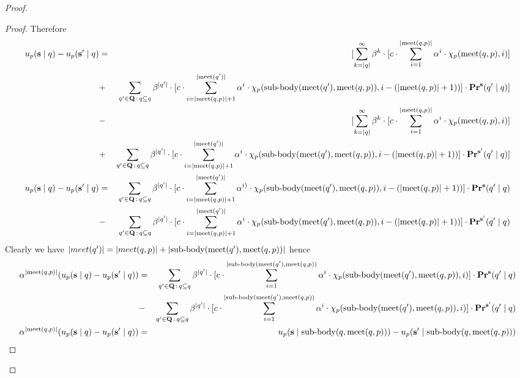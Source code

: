 \begin{proof}
\begin{proof}
Therefore
\begin{eqnarray*}
	u_p(\mathbf{s} \mid q) - u_p(\mathbf{s}' \mid q) & = & [\sum_{k = |q|}^{\infty} \beta^{k} \cdot  [{\displaystyle c \cdot \sum_{i=1}^{|\text{\rm meet}(q,p)|} \alpha^i \cdot \chi_p(\text{\rm meet}(q,p),i) }] \\
	&+ & \sum_{q' \in \mathbf{Q} \,:\, q \subseteq q} \beta^{|q'|} \cdot  [{\displaystyle c \cdot \sum_{i=|\text{\rm meet}(q,p)|+1}^{|\text{\rm meet}(q')|} \alpha^{i} \cdot \chi_p({\text{\rm sub-body}}(\text{\rm meet}(q'),\text{\rm meet}(q,p)),i-(|\text{\rm meet}(q,p)|+1))  }] \cdot \mathbf{Pr}^{\mathbf{s}}(q' \mid q) ]\\ 
	&- &[\sum_{k = |q|}^{\infty} \beta^{k} \cdot  [{\displaystyle c \cdot \sum_{i=1}^{|\text{\rm meet}(q,p)|} \alpha^i \cdot \chi_p(\text{\rm meet}(q,p),i) }] \\
	&+ & \sum_{q' \in \mathbf{Q} \,:\, q \subseteq q} \beta^{|q'|} \cdot  [{\displaystyle c \cdot \sum_{i=|\text{\rm meet}(q,p)|+1}^{|\text{\rm meet}(q')|} \alpha^{i} \cdot \chi_p({\text{\rm sub-body}}(\text{\rm meet}(q'),\text{\rm meet}(q,p)),i-(|\text{\rm meet}(q,p)|+1))  }] \cdot \mathbf{Pr}^{\mathbf{s}'}(q' \mid q) ]\\ 
	u_p(\mathbf{s} \mid q) - u_p(\mathbf{s}' \mid q) & = & \sum_{q' \in \mathbf{Q} \,:\, q \subseteq q} \beta^{|q'|} \cdot  [{\displaystyle c \cdot \sum_{i=|\text{\rm meet}(q,p)|+1}^{|\text{\rm meet}(q')|} \alpha^{i)} \cdot \chi_p({\text{\rm sub-body}}(\text{\rm meet}(q'),\text{\rm meet}(q,p)),i-(|\text{\rm meet}(q,p)|+1))  }] \cdot \mathbf{Pr}^{\mathbf{s}}(q' \mid q) \\ 
	& - & \sum_{q' \in \mathbf{Q} \,:\, q \subseteq q} \beta^{|q'|} \cdot  [{\displaystyle c \cdot \sum_{i=|\text{\rm meet}(q,p)|+1}^{|\text{\rm meet}(q')|} \alpha^{i} \cdot \chi_p({\text{\rm sub-body}}(\text{\rm meet}(q'),\text{\rm meet}(q,p)),i-(|\text{\rm meet}(q,p)|+1))  }] \cdot \mathbf{Pr}^{\mathbf{s}'}(q' \mid q) \\
\end{eqnarray*}
Clearly we have $|meet(q')| = |meet(q,p)| + |{\text{\rm sub-body}}(\text{\rm meet}(q'),\text{\rm meet}(q,p))| $ hence 
\begin{eqnarray*}
	 \alpha^{|\text{\rm meet}(q,p)|} (u_p(\mathbf{s} \mid q) - u_p(\mathbf{s}' \mid q)) & = & \sum_{q' \in \mathbf{Q} \,:\, q \subseteq q} \beta^{|q'|} \cdot  [{\displaystyle c \cdot \sum_{i=1}^{|{\text{\rm sub-body}}(\text{\rm meet}(q'),\text{\rm meet}(q,p))} \alpha^{i} \cdot \chi_p({\text{\rm sub-body}}(\text{\rm meet}(q'),\text{\rm meet}(q,p)),i)  }] \cdot \mathbf{Pr}^{\mathbf{s}}(q' \mid q) \\ 
	& - & \sum_{q' \in \mathbf{Q} \,:\, q \subseteq q} \beta^{|q'|} \cdot  [{\displaystyle c \cdot \sum_{i=1}^{|{\text{\rm sub-body}}(\text{\rm meet}(q'),\text{\rm meet}(q,p))} \alpha^{i} \cdot \chi_p({\text{\rm sub-body}}(\text{\rm meet}(q'),\text{\rm meet}(q,p)),i)  }] \cdot \mathbf{Pr}^{\mathbf{s}'}(q' \mid q) \\
	\alpha^{|\text{\rm meet}(q,p)|} (u_p(\mathbf{s} \mid q) - u_p(\mathbf{s}' \mid q)) & = & u_p(\mathbf{s} \mid {\text{\rm sub-body}}(q,\text{\rm meet}(q,p))) - u_p(\mathbf{s}' \mid {\text{\rm sub-body}}(q,\text{\rm meet}(q,p))) \\
\end{eqnarray*}
\end{proof}




\end{proof}

